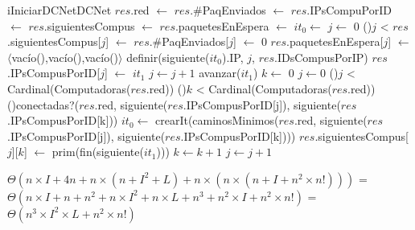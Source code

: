 \begin{Algoritmos}


  \begin{algoritmo}{iIniciarDCNet}{}{DCNet}
    $res$.red $\gets$    
    $res$.\#PaqEnviados $\gets$     
    $res$.IPsCompuPorID $\gets$     
    $res$.siguientesCompus $\gets$     
    $res$.paquetesEnEspera $\gets$     
     $it_{0} \gets$     
     $j \gets$ 0   
    \While(){$j$ < }{
      $res$.siguientesCompus[$j$] $\gets$     
      $res$.\#PaqEnviados[$j$] $\gets$ 0   
      $res$.paquetesEnEspera[$j$] $\gets$ $\langle$vac\'{i}o(),vac\'{i}o(),vac\'{i}o()$\rangle$   
      definir(siguiente($it_{0}$).IP, $j$, $res$.IDsCompusPorIP)   
      $res$.IPsCompusPorID[$j$] $\gets$ $it_{1}$   
      $j \gets j + 1$   
      avanzar($it_{1}$)   
    }
     $k \gets$ 0   
    $j \gets 0$   
    \While(){$j$ < Cardinal(Computadoras($res$.red))}{
      \While(){$k$ < Cardinal(Computadoras($res$.red))}{
        \If(){conectadas?($res$.red, siguiente($res$.IPsCompusPorID[j]), siguiente($res$.IPsCompusPorID[k]))}{
           $it_{0} \gets$ crearIt(caminosMinimos($res$.red, siguiente($res$.IPsCompusPorID[j]), siguiente($res$.IPsCompusPorID[k])))\;
          $res$.siguientesCompus[$j$][$k$] $\gets$ prim(fin(siguiente($it_{1}$)))   
        }
        $k \gets k + 1$  
      }
      $j \gets j + 1$  
    }
  \end{algoritmo}
 \datosAlgoritmo{} %
  {} %
  {} %
  {$\Theta(n \times I + 4 n + n \times (n + I^2 + L) + n \times (n \times (n + I + n^2 \times n!)))$ = $\Theta(n \times I + n + n^2+ n \times I^2 + n \times L + n^3 + n^2 \times I + n^2 \times n!)$ = $\Theta(n^3 \times I^2 \times L + n^2 \times n!)$} %
  {} %


\end{Algoritmos}
